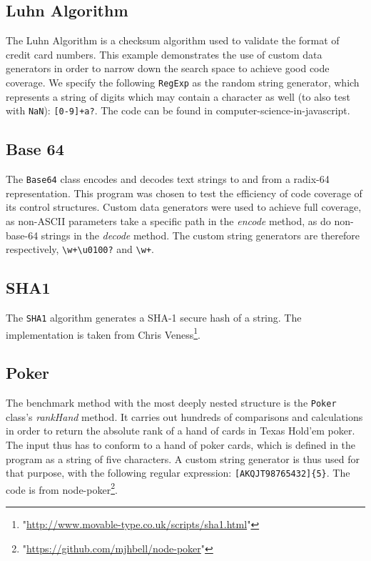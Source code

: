 \subsection{Luhn Algorithm}
The Luhn Algorithm is a checksum algorithm used to validate the format of credit card numbers. This example demonstrates the use of custom data generators in order to narrow down the search space to achieve good code coverage. We specify the following \texttt{RegExp} as the random string generator, which represents a string of digits which may contain a character as well (to also test with \texttt{NaN}): \texttt{[0-9]+a?}. The code can be found in \textsf{computer-science-in-javascript}\footnotemark[2].

\subsection{Base 64}
The \texttt{Base64} class encodes and decodes text strings to and from a radix-64 representation. This program was chosen to test the efficiency of code coverage of its control structures. Custom data generators were used to achieve full coverage, as non-ASCII parameters take a specific path in the \emph{encode} method, as do non-base-64 strings in the \emph{decode} method. The custom string generators are therefore respectively, \texttt{\textbackslash w+\textbackslash u0100?} and \texttt{\textbackslash w+}.

\subsection{SHA1}
The \texttt{SHA1} algorithm generates a SHA-1 secure hash of a string. The implementation is taken from Chris Veness\footnote{"\url{http://www.movable-type.co.uk/scripts/sha1.html}"}.

\subsection{Poker}
The benchmark method with the most deeply nested structure is the \texttt{Poker} class's \emph{rankHand} method. It carries out hundreds of comparisons and calculations in order to return the absolute rank of a hand of cards in Texas Hold'em poker. The input thus has to conform to a hand of poker cards, which is defined in the program as a string of five characters. A custom string generator is thus used for that purpose, with the following regular expression: \texttt{[AKQJT98765432]\{5\}}. The code is from \textsf{node-poker}\footnote{"\url{https://github.com/mjhbell/node-poker}"}.

